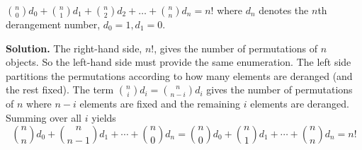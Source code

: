 \documentclass{book}
\begin{document}
\setcounter{project}{107}
\addtocounter{project}{-1}
\begin{activity}[]\label{activity-100}
\hypertarget{p-772}{}%
\(\binom{n}{0} d_{0} + \binom{n}{1} d_{1} + \binom{n}{2} d_{2} + \ldots + \binom{n}{n} d_{n} = n!\) where \(d_{n}\) denotes the \(n\)th derangement number, \(d_{0} = 1,d_{1} = 0\).%
\par\smallskip%
\noindent\textbf{Solution.}\hypertarget{solution-81}{}\quad%
\hypertarget{p-773}{}%
The right-hand side, \(n!\), gives the number of permutations of \(n\) objects. So the left-hand side must provide the same enumeration. The left side partitions the permutations according to how many elements are deranged (and the rest fixed). The term \(\binom{n}{i} d_{i} = \binom{n}{n - i} d_{i}\) gives the number of permutations of \(n\) where \(n - i\) elements are fixed and the remaining \(i\) elements are deranged. Summing over all \(i\) yields%
\begin{equation*}
\binom{n}{n} d_{0} + \binom{n}{n - 1} d_{1} + \cdots + \binom{n}{0} d_{n} = \binom{n}{0} d_{0} + \binom{n}{1} d_{1} + \cdots + \binom{n}{n} d_{n} = n!
\end{equation*}
%
\end{activity}
\end{document}
